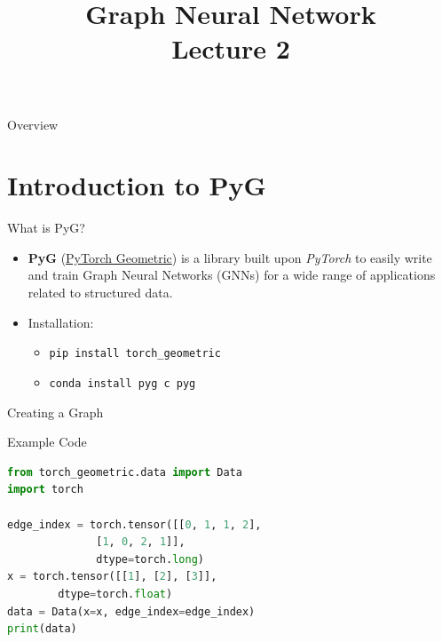 \documentclass{beamer}
\title[] %
{Graph Neural Network \\Lecture 2}
\date[] %
\begin{document}
\begin{frame}
    \titlepage
\end{frame}

\begin{frame}{Overview}
    \tableofcontents
\end{frame}

\section{Introduction to PyG}

\begin{frame}{What is PyG?}

    \begin{itemize}
        \item \textbf{PyG} (\href{https://github.com/pyg-team/pytorch_geometric}{PyTorch Geometric}) is a library built upon \textit{PyTorch} to easily write and train Graph Neural Networks (GNNs) for a wide range of applications related to structured data.
        \vspace{0.5cm}
        \item Installation:
         	\begin{itemize}
			\item \texttt{pip install torch\_geometric}
			\item  \texttt{conda install pyg \-c pyg}
		\end{itemize}
    \end{itemize}
   
\end{frame}


\begin{frame}[fragile]{Creating a Graph}
    \begin{block}{Example Code}
        \begin{lstlisting}[language=Python]
from torch_geometric.data import Data
import torch

edge_index = torch.tensor([[0, 1, 1, 2], 
			  [1, 0, 2, 1]], 
			  dtype=torch.long)
x = torch.tensor([[1], [2], [3]], 
		dtype=torch.float)
data = Data(x=x, edge_index=edge_index)
print(data)
        \end{lstlisting}
    \end{block}
\end{frame}
\end{document}
